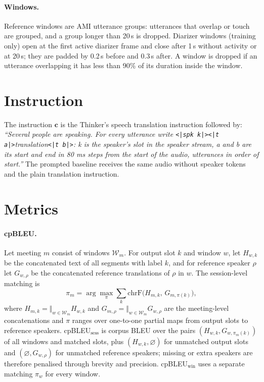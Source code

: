 \paragraph{Windows.} Reference windows are AMI utterance groups: utterances that overlap or touch are grouped, and a
group longer than 20\,s is dropped. Diarizer windows (training only) open at the first active diarizer frame and close
after 1\,s without activity or at 20\,s; they are padded by 0.2\,s before and 0.3\,s after. A window is dropped if an
utterance overlapping it has less than 90\% of its duration inside the window.

\section{Instruction}
\label{app:prompt}

The instruction $\bm{c}$ is the Thinker's speech translation instruction followed by: \emph{``Several people are
speaking. For every utterance write \texttt{<|spk k|><|t a|>}translation\texttt{<|t b|>}: k is the speaker's slot in the
speaker stream, a and b are its start and end in 80 ms steps from the start of the audio, utterances in order of
start.''} The prompted baseline receives the same audio without speaker tokens and the plain translation
instruction.

\section{Metrics}
\label{app:metrics}

\paragraph{cpBLEU.} Let meeting $m$ consist of windows $\mathcal{W}_m$. For output slot $k$ and window $w$, let
$H_{w,k}$ be the concatenated text of all segments with label $k$, and for reference speaker $\rho$ let $G_{w,\rho}$ be
the concatenated reference translations of $\rho$ in $w$. The session-level matching is
\begin{equation}
\pi_m=\arg\max_{\pi}\sum_{k}\mathrm{chrF}\big(H_{m,k},\,G_{m,\pi(k)}\big),
\end{equation}
where $H_{m,k}=\Vert_{w\in\mathcal{W}_m}H_{w,k}$ and $G_{m,\rho}=\Vert_{w\in\mathcal{W}_m}G_{w,\rho}$ are the
meeting-level concatenations and $\pi$ ranges over one-to-one partial maps from output slots to reference speakers. cpBLEU$_\text{sess}$ is corpus BLEU over the
pairs $(H_{w,k},G_{w,\pi_m(k)})$ of all windows and matched slots, plus $(H_{w,k},\varnothing)$ for unmatched output
slots and $(\varnothing,G_{w,\rho})$ for unmatched reference speakers; missing or extra speakers are therefore
penalised through brevity and precision. cpBLEU$_\text{win}$ uses a separate matching $\pi_w$ for every window.

